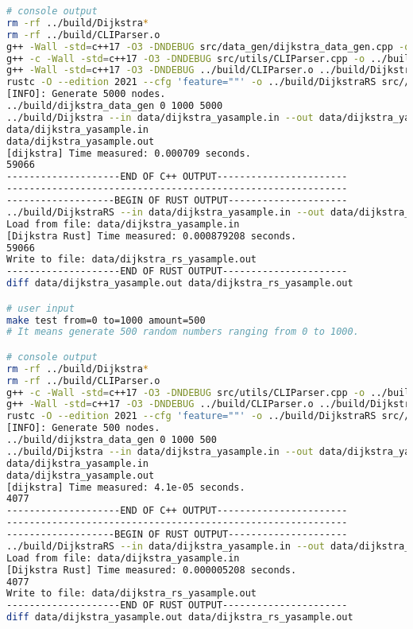\begin{lstlisting}[language=bash]
# console output
rm -rf ../build/Dijkstra*
rm -rf ../build/CLIParser.o
g++ -Wall -std=c++17 -O3 -DNDEBUG src/data_gen/dijkstra_data_gen.cpp -o ../build/dijkstra_data_gen
g++ -c -Wall -std=c++17 -O3 -DNDEBUG src/utils/CLIParser.cpp -o ../build/CLIParser.o
g++ -Wall -std=c++17 -O3 -DNDEBUG ../build/CLIParser.o ../build/Dijkstra.o -o ../build/Dijkstra
rustc -O --edition 2021 --cfg 'feature=""' -o ../build/DijkstraRS src//main.rs
[INFO]: Generate 5000 nodes.
../build/dijkstra_data_gen 0 1000 5000
../build/Dijkstra --in data/dijkstra_yasample.in --out data/dijkstra_yasample.out
data/dijkstra_yasample.in
data/dijkstra_yasample.out
[dijkstra] Time measured: 0.000709 seconds.
59066
--------------------END OF C++ OUTPUT-----------------------
------------------------------------------------------------
-------------------BEGIN OF RUST OUTPUT---------------------
../build/DijkstraRS --in data/dijkstra_yasample.in --out data/dijkstra_rs_yasample.out
Load from file: data/dijkstra_yasample.in
[Dijkstra Rust] Time measured: 0.000879208 seconds.
59066
Write to file: data/dijkstra_rs_yasample.out
--------------------END OF RUST OUTPUT----------------------
diff data/dijkstra_yasample.out data/dijkstra_rs_yasample.out

# user input
make test from=0 to=1000 amount=500
# It means generate 500 random numbers ranging from 0 to 1000.

# console output
rm -rf ../build/Dijkstra*
rm -rf ../build/CLIParser.o
g++ -c -Wall -std=c++17 -O3 -DNDEBUG src/utils/CLIParser.cpp -o ../build/CLIParser.o
g++ -Wall -std=c++17 -O3 -DNDEBUG ../build/CLIParser.o ../build/Dijkstra.o -o ../build/Dijkstra
rustc -O --edition 2021 --cfg 'feature=""' -o ../build/DijkstraRS src//main.rs
[INFO]: Generate 500 nodes.
../build/dijkstra_data_gen 0 1000 500
../build/Dijkstra --in data/dijkstra_yasample.in --out data/dijkstra_yasample.out
data/dijkstra_yasample.in
data/dijkstra_yasample.out
[dijkstra] Time measured: 4.1e-05 seconds.
4077
--------------------END OF C++ OUTPUT-----------------------
------------------------------------------------------------
-------------------BEGIN OF RUST OUTPUT---------------------
../build/DijkstraRS --in data/dijkstra_yasample.in --out data/dijkstra_rs_yasample.out
Load from file: data/dijkstra_yasample.in
[Dijkstra Rust] Time measured: 0.000005208 seconds.
4077
Write to file: data/dijkstra_rs_yasample.out
--------------------END OF RUST OUTPUT----------------------
diff data/dijkstra_yasample.out data/dijkstra_rs_yasample.out
\end{lstlisting}

